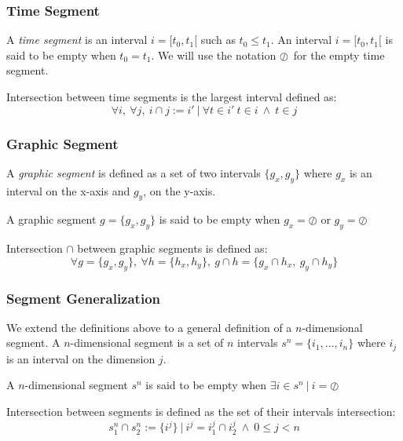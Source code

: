 \documentclass[twoside,10pt]{article}
\newcommand{\emptytseg}		{\ensuremath{\oslash}}
\begin{document}
\subsubsection{Time Segment}\label{subsec:timeseg}

A \emph{time segment} is an interval
 $i=[t_{0},t_{1}[$ such as $t_{0} \leqslant t_{1}$.
An interval $i=[t_{0},t_{1}[$ is said to be empty when $t_{0} = t_{1}$. We will use the notation \emptytseg\ for the empty time segment.

Intersection between time segments is the largest interval defined as:
\[ 
\forall i,\ \forall  j, 
\ i \cap j  := i' \ |\ \forall t \in i'\  t \in i \ \land\ t \in j   
\]


\subsubsection{Graphic Segment}\label{subsec:graphicseg}
A \emph{graphic segment} is defined as a set of two intervals $\{g_x,g_y\}$ where $g_x$ is an interval on the x-axis and $g_y$, on the y-axis.

A graphic segment $g=\{g_x,g_y\}$ is said to be empty when $g_x = \emptytseg$ or $g_y = \emptytseg$

Intersection $\cap$ between graphic segments is defined as:
\[ 
\forall g=\{g_x,g_y\},\ \forall  h=\{h_x,h_y\},\ g \cap h = \{g_x \cap h_x,\ g_y \cap h_y\}
\]

\subsubsection{Segment Generalization}\label{subsec:generalseg}

We extend the definitions above to a general definition of a $n$-dimensional segment.
A $n$-dimensional segment is a set of $n$ intervals $s^n=\{i_1,...,i_n\}$ where $i_j$ is an interval on the dimension $j$.

A $n$-dimensional segment $s^n$ is said to be empty when $\exists i \in s^n\ |\ i = \emptytseg $

Intersection between segments is defined as the set of their intervals intersection:
\begin{equation}
s_1^n \cap s_2^n := \{i^j\}\ |\ i^j = i_1^j \cap i_2^j\ \land\  0 \leqslant j < n
\end{equation}
\end{document}
